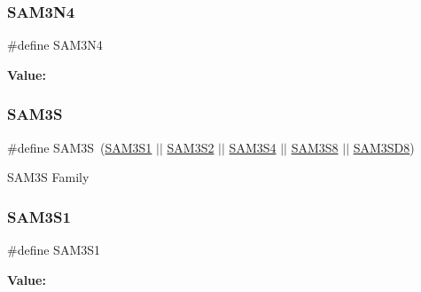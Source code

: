 \subsubsection{\texorpdfstring{SAM3N4}{SAM3N4}}
{\footnotesize\ttfamily \#define S\+A\+M3\+N4}

{\bfseries Value\+:}
\begin{DoxyCode}{0}
\DoxyCodeLine{( \(\backslash\)}
\DoxyCodeLine{        )}

\end{DoxyCode}
\mbox{\label{group__sam__part__macros__group_gaaa8d9ee5981c67997fbdf923247bcb68}} 
\subsubsection{\texorpdfstring{SAM3S}{SAM3S}}
{\footnotesize\ttfamily \#define S\+A\+M3S~(\mbox{\hyperlink{group__sam__part__macros__group_gac1f138c6fe48b20faa71fb2d68d68b52}{S\+A\+M3\+S1}} $\vert$$\vert$ \mbox{\hyperlink{group__sam__part__macros__group_ga3665c1cc7fa5ad33231fde9e16b562cd}{S\+A\+M3\+S2}} $\vert$$\vert$ \mbox{\hyperlink{group__sam__part__macros__group_gae92413f616568bd2f38622e20f4925e0}{S\+A\+M3\+S4}} $\vert$$\vert$ \mbox{\hyperlink{group__sam__part__macros__group_gaea8f1cca303520385d12110ad8e8bafe}{S\+A\+M3\+S8}} $\vert$$\vert$ \mbox{\hyperlink{group__sam__part__macros__group_ga9f16069247b2e38ddb0bcaa912750a4f}{S\+A\+M3\+S\+D8}})}

S\+A\+M3S Family \mbox{\label{group__sam__part__macros__group_gac1f138c6fe48b20faa71fb2d68d68b52}} 
\subsubsection{\texorpdfstring{SAM3S1}{SAM3S1}}
{\footnotesize\ttfamily \#define S\+A\+M3\+S1}

{\bfseries Value\+:}
\begin{DoxyCode}{0}
\DoxyCodeLine{( \(\backslash\)}
\DoxyCodeLine{        )}

\end{DoxyCode}
\mbox{\label{group__sam__part__macros__group_ga3665c1cc7fa5ad33231fde9e16b562cd}} 
